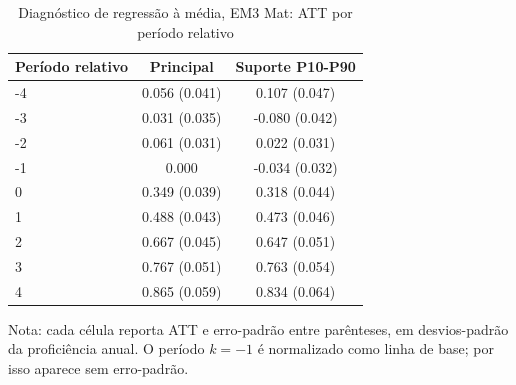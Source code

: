 \begin{table}[!htbp]
\centering
\caption{Diagnóstico de regressão à média, EM3 Mat: ATT por período relativo}
\label{tab:ap_event_regmedia_em3_mat}
\vspace{-0.15cm}
\scriptsize
\setlength{\tabcolsep}{4pt}
\renewcommand{\arraystretch}{0.92}
\begin{tabular}{lcc}
\toprule
Período relativo & Principal & Suporte P10-P90 \\
\midrule
-4 & 0.056 (0.041) & 0.107 (0.047) \\
-3 & 0.031 (0.035) & -0.080 (0.042) \\
-2 & 0.061 (0.031) & 0.022 (0.031) \\
-1 & 0.000 & -0.034 (0.032) \\
0 & 0.349 (0.039) & 0.318 (0.044) \\
1 & 0.488 (0.043) & 0.473 (0.046) \\
2 & 0.667 (0.045) & 0.647 (0.051) \\
3 & 0.767 (0.051) & 0.763 (0.054) \\
4 & 0.865 (0.059) & 0.834 (0.064) \\
\bottomrule
\end{tabular}
\begin{flushleft}
\footnotesize Nota: cada célula reporta ATT e erro-padrão entre parênteses, em desvios-padrão da proficiência anual. O período \(k=-1\) é normalizado como linha de base; por isso aparece sem erro-padrão.
\end{flushleft}
\end{table}
